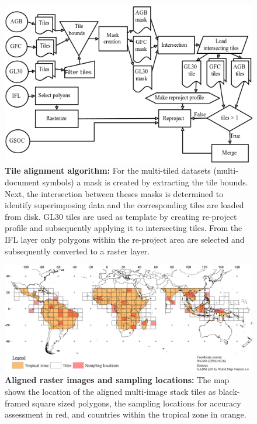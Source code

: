 		\begin{figure}[ht]
			\centering
			\includegraphics[scale=.9]{img/align}
			\caption[Tile alignment algorithm]{\textbf{Tile alignment algorithm:} For the multi-tiled datasets (multi-document symbols) a mask is created by extracting the tile bounds. Next, the intersection between theses masks is determined to identify superimposing data and the corresponding tiles are loaded from disk. \ac{GL30} tiles are used as template by creating re-project profile and subsequently applying it to intersecting tiles. From the \ac{IFL} layer only polygons within the re-project area are selected and subsequently converted to a raster layer.}
			\label{fig:preprocessing_flowchart}
		\end{figure}
		\begin{figure}[!ht]
			\centering
			\includegraphics[scale=.95]{img/method_overview_frameless}
			\caption[Aligned raster images and sampling locations]{\textbf{Aligned raster images and sampling locations:} The map shows the location of the aligned multi-image stack tiles as black-framed square sized polygons, the sampling locations for accuracy assessment in red, and countries within the tropical zone in orange.}
			\label{fig:aism}
		\end{figure}

